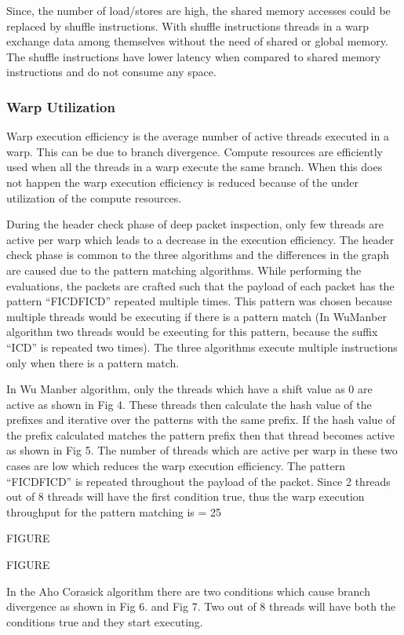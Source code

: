 Since, the number of load/stores are high, the shared memory accesses could be replaced by shuffle instructions. With shuffle instructions threads in a warp exchange data among themselves without the need of shared or global memory. The shuffle instructions have lower latency when compared to shared memory instructions and do not consume any space.

\subsubsection{Warp Utilization}
Warp execution efficiency is the average number of active threads executed in a warp. This can be due to branch divergence. Compute resources are efficiently used when all the threads in a warp execute the same branch. When this does not happen the warp execution efficiency is reduced because of the under utilization of the compute resources.

During the header check phase of deep packet inspection, only few threads are active per warp which leads to a decrease in the execution efficiency. The header check phase is common to the three algorithms and the differences in the graph are caused due to the pattern matching algorithms.
While performing the evaluations, the packets are crafted such that the payload of each packet has the pattern “FICDFICD” repeated multiple times. This pattern was chosen because multiple threads would be executing if there is a pattern match (In WuManber algorithm two threads would be executing for this pattern, because the suffix “ICD” is repeated two times). The three algorithms execute multiple instructions only when there is a pattern match. 

In Wu Manber algorithm, only the threads which have a shift value as 0 are active as shown in Fig 4. These threads then calculate the hash value of the prefixes and iterative over the patterns with the same prefix. If the hash value of the prefix calculated matches the pattern prefix then that thread becomes active as shown in Fig 5. The number of threads which are active per warp in these two cases are low which reduces the warp execution efficiency. The pattern “FICDFICD” is repeated throughout the payload of the packet. Since 2 threads out of 8 threads will have the first condition true, thus the warp execution throughput for the pattern matching is = 25%

FIGURE

FIGURE

In the Aho Corasick algorithm there are two conditions which cause branch divergence as shown in Fig 6. and Fig 7. Two out of 8 threads will have both the conditions true and they start executing. 

